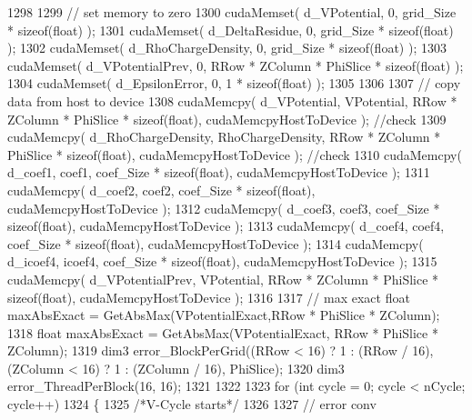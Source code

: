 \begin{DoxyCode}
1298 
1299     \textcolor{comment}{// set memory to zero}
1300     cudaMemset( d\_VPotential, 0, grid\_Size * \textcolor{keyword}{sizeof}(\textcolor{keywordtype}{float}) );
1301     cudaMemset( d\_DeltaResidue, 0, grid\_Size * \textcolor{keyword}{sizeof}(\textcolor{keywordtype}{float}) );
1302     cudaMemset( d\_RhoChargeDensity, 0, grid\_Size * \textcolor{keyword}{sizeof}(\textcolor{keywordtype}{float}) );
1303     cudaMemset( d\_VPotentialPrev, 0, RRow * ZColumn * PhiSlice * \textcolor{keyword}{sizeof}(\textcolor{keywordtype}{float}) );
1304     cudaMemset( d\_EpsilonError, 0, 1 * \textcolor{keyword}{sizeof}(\textcolor{keywordtype}{float}) );
1305 
1306 
1307     \textcolor{comment}{// copy data from host to device}
1308     cudaMemcpy( d\_VPotential, VPotential, RRow * ZColumn * PhiSlice * \textcolor{keyword}{sizeof}(\textcolor{keywordtype}{float}), cudaMemcpyHostToDevice
       ); \textcolor{comment}{//check}
1309     cudaMemcpy( d\_RhoChargeDensity, RhoChargeDensity, RRow * ZColumn * PhiSlice * \textcolor{keyword}{sizeof}(\textcolor{keywordtype}{float}), 
      cudaMemcpyHostToDevice ); \textcolor{comment}{//check}
1310     cudaMemcpy( d\_coef1, coef1, coef\_Size * \textcolor{keyword}{sizeof}(\textcolor{keywordtype}{float}), cudaMemcpyHostToDevice );
1311     cudaMemcpy( d\_coef2, coef2, coef\_Size * \textcolor{keyword}{sizeof}(\textcolor{keywordtype}{float}), cudaMemcpyHostToDevice );
1312     cudaMemcpy( d\_coef3, coef3, coef\_Size * \textcolor{keyword}{sizeof}(\textcolor{keywordtype}{float}), cudaMemcpyHostToDevice );
1313     cudaMemcpy( d\_coef4, coef4, coef\_Size * \textcolor{keyword}{sizeof}(\textcolor{keywordtype}{float}), cudaMemcpyHostToDevice );
1314     cudaMemcpy( d\_icoef4, icoef4, coef\_Size * \textcolor{keyword}{sizeof}(\textcolor{keywordtype}{float}), cudaMemcpyHostToDevice );
1315     cudaMemcpy( d\_VPotentialPrev, VPotential, RRow * ZColumn * PhiSlice * \textcolor{keyword}{sizeof}(\textcolor{keywordtype}{float}), 
      cudaMemcpyHostToDevice );
1316     
1317     \textcolor{comment}{// max exact    float maxAbsExact = GetAbsMax(VPotentialExact,RRow * PhiSlice * ZColumn);}
1318     \textcolor{keywordtype}{float} maxAbsExact = GetAbsMax(VPotentialExact, RRow * PhiSlice * ZColumn);
1319     dim3 error\_BlockPerGrid((RRow < 16) ? 1 : (RRow / 16), (ZColumn < 16) ? 1 : (ZColumn / 16), PhiSlice);
1320     dim3 error\_ThreadPerBlock(16, 16);      
1321 
1322 
1323     \textcolor{keywordflow}{for} (\textcolor{keywordtype}{int} cycle = 0; cycle < nCycle; cycle++)
1324     \{
1325     \textcolor{comment}{/*V-Cycle starts*/}
1326 
1327         \textcolor{comment}{// error conv       }

\end{DoxyCode}
